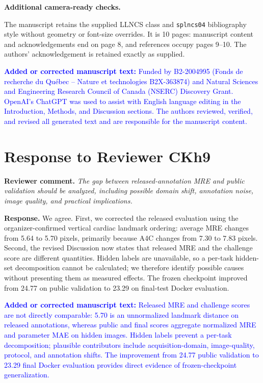 \documentclass[11pt]{article}
\newcommand{\reviewcomment}[1]{\par\noindent\textbf{Reviewer comment.} \emph{#1}\par}
\newcommand{\response}[1]{\par\noindent\textbf{Response.} #1\par}
\newcommand{\manuscriptchange}[1]{\par\smallskip\noindent\textcolor{blue}{\textbf{Added or corrected manuscript text:} #1}\par\smallskip}
\begin{document}
\par\smallskip\noindent\textbf{Additional camera-ready checks.}\par
The manuscript retains the supplied LLNCS class and \texttt{splncs04} bibliography style without geometry or font-size overrides. It is 10 pages: manuscript content and acknowledgements end on page 8, and references occupy pages 9--10. The authors' acknowledgement is retained exactly as supplied.

\manuscriptchange{Funded by B2-2004995 (Fonds de recherche du Qu\'ebec – Nature et technologies B2X-363874) and Natural Sciences and Engineering Research Council of Canada (NSERC) Discovery Grant. OpenAI's ChatGPT was used to assist with English language editing in the Introduction, Methods, and Discussion sections. The authors reviewed, verified, and revised all generated text and are responsible for the manuscript content.}

\section*{Response to Reviewer CKh9}

\reviewcomment{The gap between released-annotation MRE and public validation should be analyzed, including possible domain shift, annotation noise, image quality, and practical implications.}
\response{We agree. First, we corrected the released evaluation using the organizer-confirmed vertical cardiac landmark ordering: average MRE changes from 5.64 to 5.70 pixels, primarily because A4C changes from 7.30 to 7.83 pixels. Second, the revised Discussion now states that released MRE and the challenge score are different quantities. Hidden labels are unavailable, so a per-task hidden-set decomposition cannot be calculated; we therefore identify possible causes without presenting them as measured effects. The frozen checkpoint improved from 24.77 on public validation to 23.29 on final-test Docker evaluation.}

\manuscriptchange{Released MRE and challenge scores are not directly comparable: 5.70 is an unnormalized landmark distance on released annotations, whereas public and final scores aggregate normalized MRE and parameter MAE on hidden images. Hidden labels prevent a per-task decomposition; plausible contributors include acquisition-domain, image-quality, protocol, and annotation shifts. The improvement from 24.77 public validation to 23.29 final Docker evaluation provides direct evidence of frozen-checkpoint generalization.}
\end{document}

